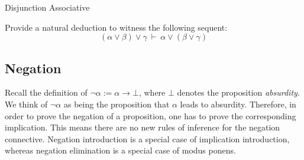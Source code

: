 \documentclass{book}
\begin{document}
    \begin{eg}{Disjunction Associative}

        Provide a natural deduction to witness the following sequent: $$(\alpha \lor \beta) \lor \gamma \ \vdash \ \alpha \lor (\beta \lor \gamma) $$

        
    \end{eg}

    \newpage
    \subsection{Negation}

    Recall the definition of $\lnot \alpha := \alpha \to \bot$, where $\bot$ denotes the proposition \emph{absurdity}. We think of $\lnot \alpha$ as being the proposition that $\alpha$ leads to absurdity. Therefore, in order to prove the negation of a proposition, one has to prove the corresponding implication. This means there are no new rules of inference for the negation connective. Negation introduction is a special case of implication introduction, whereas negation elimination is a special case of modus ponens. 
\end{document}
